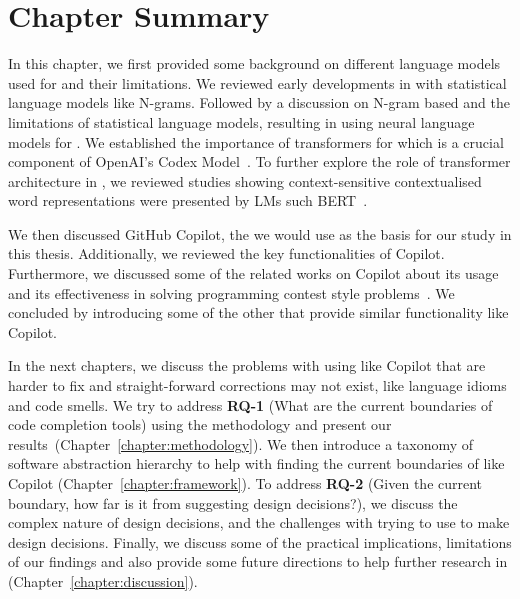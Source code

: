 \section{Chapter Summary}
In this chapter, we first provided some background on different language models used for \cct{} and their limitations. We reviewed early developments in \cct{} with statistical language models like N-grams. Followed by a discussion on N-gram based \cct{} and the limitations of statistical language models, resulting in using neural language models for \cct{}. We established the importance of transformers for \cct{} which is a crucial component of OpenAI's Codex Model~\cite{copilot}. To further explore the role of transformer architecture in \cct{}, we reviewed studies showing context-sensitive contextualised word representations were presented by LMs such BERT~\cite{bert}.

We then discussed GitHub Copilot, the \cct{} we would use as the basis for our study in this thesis. Additionally, we reviewed the key functionalities of Copilot.
Furthermore, we discussed some of the related works on Copilot about its usage~\cite{Vaithilingam2022} and its effectiveness in solving programming contest style problems~\cite{empirical_eval}. We concluded by introducing some of the other \cct{} that provide similar functionality like Copilot.

In the next chapters, we discuss the problems with using \cct{} like Copilot that are harder to fix and straight-forward corrections may not exist, like language idioms and code smells. 
We try to address \textbf{RQ-1} (What are the current boundaries of code completion tools) using the methodology and present our results~(Chapter~\ref{chapter:methodology}).
We then introduce a taxonomy of software abstraction hierarchy to help with finding the current boundaries of \cct{} like Copilot (Chapter~\ref{chapter:framework}). To address \textbf{RQ-2} (Given the current boundary, how far is it from suggesting design decisions?), we discuss the complex nature of design decisions, and the challenges with trying to use \cct{} to make design decisions.
Finally, we discuss some of the practical implications, limitations of our findings and also provide some future directions to help further research in \cct{} (Chapter~\ref{chapter:discussion}).